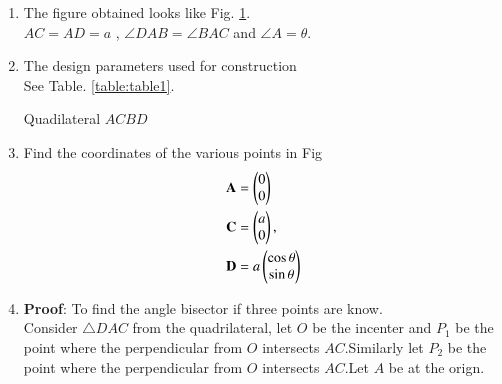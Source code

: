 \renewcommand{\theequation}{\theenumi}
\begin{enumerate}[label=\thesection.\arabic*.,ref=\thesection.\theenumi]

\begin{figure}[!ht]
\centering
\resizebox{\columnwidth}{!}{}
\caption{quadilateral by Latex-Tikz}
\label{fig:quad}	
\end{figure}
 
\item The figure obtained looks like Fig. \ref{fig:quad}.\\
 $AC = AD = a$ , $\angle{DAB} = \angle{BAC}$ and $\angle A = \theta$. 


\item The design parameters used for construction \\
\solution See Table. \ref{table:table1}.
\begin{table}[ht!]
\centering

\caption{Quadilateral $ACBD$}
\label{table:table1}	
\end{table} 

\item Find the coordinates of the various points in Fig
\begin{align}
\mathbf{A} &=\begin{pmatrix}0\\0\end{pmatrix} \label{eq:constr_a}\\
\mathbf{C} &= \begin{pmatrix}a\\0\end{pmatrix}, \label{eq:constr_c}\\ 
\mathbf{D} &= a\begin{pmatrix}\cos{\theta}\\\sin{\theta}\end{pmatrix}\label{eq:constr_b}
\end{align}

\item \textbf{Proof}: To find the angle bisector if three points are know.\\
\solution Consider $\triangle DAC$ from the quadrilateral, let $O$ be the incenter and $P_1$ be the point where the perpendicular from $O$ intersects $AC$.Similarly let $P_2$ be the point where the perpendicular from $O$ intersects $AC$.Let $A$ be at the orign.


\end{enumerate}
